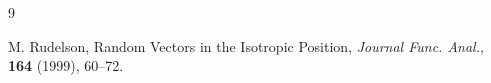 \documentclass[article,12pt]{amsart}
\begin{document}
\begin{thebibliography}{9}



	







 M. Rudelson, Random Vectors in the Isotropic Position, \emph{Journal Func. Anal.}, \textbf{164} (1999), 60--72.






 
 
 
 

\end{thebibliography}
\end{document}
